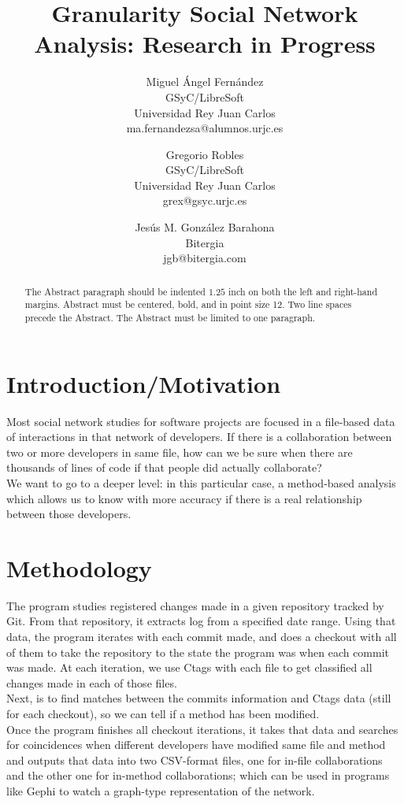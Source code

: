 \documentclass[a4paper]{article}
\title{Granularity Social Network Analysis: Research in Progress}
\author{
Miguel Ángel Fernández \\ GSyC/LibreSoft \\
                Universidad Rey Juan Carlos \\ ma.fernandezsa@alumnos.urjc.es
\and
Gregorio Robles \\ GSyC/LibreSoft \\
                Universidad Rey Juan Carlos \\ grex@gsyc.urjc.es
\and
Jesús M. González Barahona \\ Bitergia \\
                jgb@bitergia.com
}
\begin{document}
\maketitle

\begin{abstract}
The Abstract paragraph should be indented $1.25$ inch on both
the left and right-hand margins. Abstract must be centered, bold, and
in point size 12. Two line spaces precede the Abstract. The Abstract
must be limited to one paragraph.
\end{abstract}
\vskip 32pt


\section{Introduction/Motivation}

Most social network studies for software projects are focused in a file-based
data of interactions in that network of developers. If there is a
collaboration between two or more developers in same file, how can we be sure
when there are thousands of lines of code if that people did actually
collaborate? \\
We want to go to a deeper level: in this particular case, a method-based
analysis which allows us to know with more accuracy if there is a real
relationship between those developers.

\section{Methodology}

The program studies registered changes made in a given repository tracked by
Git. From that repository, it extracts log from a specified date range. Using
that data, the program iterates with each commit made, and does a checkout
with all of them to take the repository to the state the program was when each
commit was made. At each iteration, we use Ctags with each file to get
classified all changes made in each of those files.\\ Next, is to find matches
between the commits information and Ctags data (still for each checkout), so
we can tell if a method has been modified.\\
Once the program finishes all checkout iterations, it takes that data and
searches for coincidences when different developers have modified same file
and method and outputs that data into two CSV-format files, one for in-file
collaborations and the other one for in-method collaborations; which can be
used in programs like Gephi to watch a graph-type representation of the
network.
\end{document}
